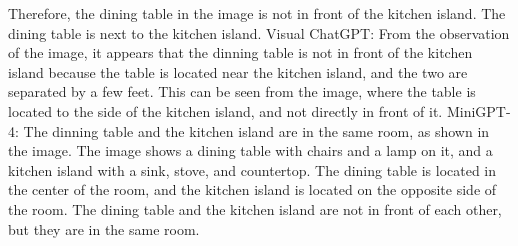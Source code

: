 \begin{enumerate}
    Therefore, the dining table in the image is not in front of the kitchen island. The dining table is next to the kitchen island.
    \subitem Visual ChatGPT: From the observation of the image, it appears that the dinning table is not in front of the kitchen island because the table is located near the kitchen island, and the two are separated by a few feet. This can be seen from the image, where the table is located to the side of the kitchen island, and not directly in front of it.
    \subitem MiniGPT-4: The dinning table and the kitchen island are in the same room, as shown in the image. The image shows a dining table with chairs and a lamp on it, and a kitchen island with a sink, stove, and countertop. The dining table is located in the center of the room, and the kitchen island is located on the opposite side of the room. The dining table and the kitchen island are not in front of each other, but they are in the same room.
\end{enumerate}
